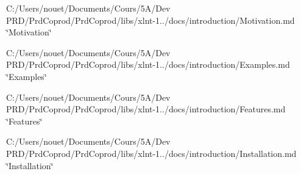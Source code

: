 
\begin{DoxyItemize}
\item C\+:/\+Users/nouet/\+Documents/\+Cours/5\+A/\+Dev PRD/\+Prd\+Coprod/\+Prd\+Coprod/libs/xlnt-\/1../docs/introduction/\+Motivation.md \char`\"{}\+Motivation\char`\"{}
\item C\+:/\+Users/nouet/\+Documents/\+Cours/5\+A/\+Dev PRD/\+Prd\+Coprod/\+Prd\+Coprod/libs/xlnt-\/1../docs/introduction/\+Examples.md \char`\"{}\+Examples\char`\"{}
\item C\+:/\+Users/nouet/\+Documents/\+Cours/5\+A/\+Dev PRD/\+Prd\+Coprod/\+Prd\+Coprod/libs/xlnt-\/1../docs/introduction/\+Features.md \char`\"{}\+Features\char`\"{}
\item C\+:/\+Users/nouet/\+Documents/\+Cours/5\+A/\+Dev PRD/\+Prd\+Coprod/\+Prd\+Coprod/libs/xlnt-\/1../docs/introduction/\+Installation.md \char`\"{}\+Installation\char`\"{} 
\end{DoxyItemize}